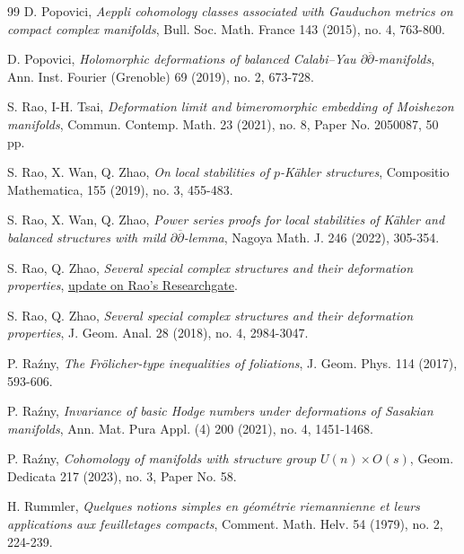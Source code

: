 \documentclass[12pt]{amsart}
\numberwithin{equation}{section}
\theoremstyle{definition}
\theoremstyle{definition}
\theoremstyle{definition}
\renewcommand{\1}{\mathsf{1}}
\renewcommand{\>}{\rightarrow}
\newcommand{\p}{\partial}
\newcommand{\bp}{\overline\partial}
\def\p{\partial}
\theoremstyle{plain} %
\theoremstyle{plain} %
\theoremstyle{plain} %
\begin{document}
\begin{thebibliography}{99}
		 D. Popovici,
		\newblock \textit{Aeppli cohomology classes associated with Gauduchon metrics on compact complex manifolds},
		\newblock Bull. Soc. Math. France 143 (2015), no. 4, 763-800.
		
		 D. Popovici,
		\newblock\textit{Holomorphic deformations of balanced Calabi--Yau $\p\bp$-manifolds},
		\newblock Ann. Inst. Fourier (Grenoble) 69 (2019), no. 2, 673-728.
		
		 S. Rao, I-H. Tsai, \newblock\textit{Deformation limit and bimeromorphic embedding of Moishezon manifolds},
		\newblock  Commun. Contemp. Math. 23 (2021), no. 8, Paper No. 2050087, 50 pp.
		
		
		S. Rao, X. Wan, Q. Zhao,
		\newblock \textit{On local stabilities of $p$-K\"ahler structures},
		\newblock Compositio Mathematica, 155 (2019), no. 3, 455-483.
		
		S. Rao, X. Wan, Q. Zhao,
		\newblock\textit{Power series proofs for local stabilities of K\"ahler and balanced structures with mild $\p\bp$-lemma},
		\newblock Nagoya Math. J. 246 (2022), 305-354.
		
		S. Rao, Q. Zhao,
		\newblock \textit{Several special complex structures and their deformation properties}, \href{https://www.researchgate.net/publication/301877734_Several_Special_Complex^Structures_and_Their_Deformation_Properties}{update on Rao's Researchgate}.
		
		S. Rao, Q. Zhao,
		\newblock \textit{Several special complex structures and their deformation properties},
		\newblock J. Geom. Anal. 28 (2018), no. 4, 2984-3047.
		
	
		 P. Ra\'zny,
		\newblock\textit{The Fr\"olicher-type inequalities of foliations},
		\newblock J. Geom. Phys. 114 (2017), 593-606.
		
		
		 P. Ra\'zny,
		\newblock\textit{Invariance of basic Hodge numbers under deformations of Sasakian manifolds},
		\newblock Ann. Mat. Pura Appl. (4) 200 (2021), no. 4, 1451-1468.
		
		
		 P. Ra\'zny,
		\newblock\textit{Cohomology of manifolds with structure group $U(n)\times O(s)$}, Geom. Dedicata 217 (2023), no. 3, Paper No. 58.
		
		 H. Rummler,
		\newblock\textit{Quelques notions simples en g\'eom\'etrie riemannienne et leurs applications aux feuilletages compacts},
		\newblock Comment. Math. Helv. 54 (1979), no. 2, 224-239.
		

\end{thebibliography}
\end{document}
